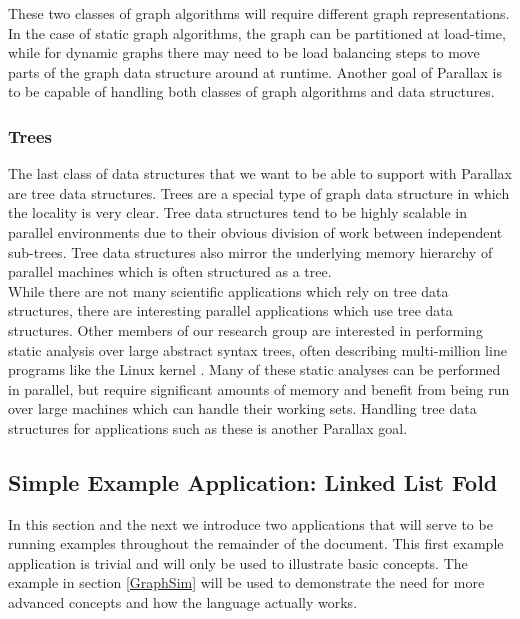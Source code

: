 \documentclass{article}
\theoremstyle{definition}
\begin{document}
\noindent
These two classes of graph algorithms will require different graph 
representations.  In the case of static graph algorithms, the graph
can be partitioned at load-time, while for dynamic graphs there may need
to be load balancing steps to move parts of the graph data structure
around at runtime.  Another goal of Parallax is to be capable of handling
both classes of graph algorithms and data structures.

\subsubsection{Trees \label{Trees}}
\noindent
The last class of data structures that we want to be able to support
with Parallax are tree data structures.  Trees are a special type of
graph data structure in which the locality is very clear.  Tree data
structures tend to be highly scalable in parallel environments due to 
their obvious division of work between independent sub-trees.  Tree
data structures also mirror the underlying memory hierarchy of parallel
machines which is often structured as a tree.\\

\noindent
While there are not many scientific applications which rely on tree
data structures, there are interesting parallel applications which use
tree data structures.  Other members of our research group are interested
in performing static analysis over large abstract syntax trees, often
describing multi-million line programs like the Linux kernel \cite{Dillig10}.
Many of these static analyses can be performed in parallel, but require
significant amounts of memory and benefit from being run over large machines
which can handle their working sets.  Handling tree data structures
for applications such as these is another Parallax goal.

\subsection{Simple Example Application: Linked List Fold \label{LinkedList}}
\noindent
In this section and the next we introduce two applications that will serve to
be running examples throughout the remainder of the document.  This first
example application is trivial and will only be used to illustrate basic
concepts.  The example in section \ref{GraphSim} will be used to demonstrate
the need for more advanced concepts and how the language actually works.\\
\end{document}
